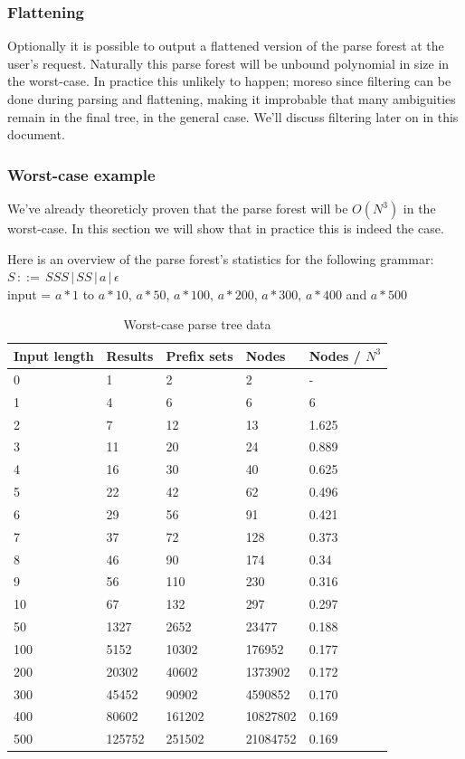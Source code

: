 \documentclass[a4paper,10pt]{article}
\begin{document}
\subsubsection{Flattening}
Optionally it is possible to output a flattened version of the parse forest at the user's request. Naturally this parse forest will be unbound polynomial in size in the worst-case. In practice this unlikely to happen; moreso since filtering can be done during parsing and flattening, making it improbable that many ambiguities remain in the final tree, in the general case. We'll discuss filtering later on in this document.

\subsubsection{Worst-case example}
We've already theoreticly proven that the parse forest will be $O(N^3)$ in the worst-case. In this section we will show that in practice this is indeed the case.

Here is an overview of the parse forest's statistics for the following grammar:\\
$S\,::=\,SSS\,|\,SS\,|\,a\,|\,\epsilon$\\
input = $a * 1$ to $a * 10$, $a * 50$, $a * 100$, $a * 200$, $a * 300$, $a * 400$ and $a * 500$

\begin{table}[H]
\centering
\begin{tabular}{ | p{6em} | p{4em} | p{5em} | p{4em} | p{5em} | }
  \hline
  Input length & Results & Prefix sets & Nodes & Nodes / $N^3$ \\
  \hline
  0 & 1 & 2 & 2 & - \\
  1 & 4 & 6 & 6 & 6 \\
  2 & 7 & 12 & 13 & 1.625 \\
  3 & 11 & 20 & 24 & 0.889 \\
  4 & 16 & 30 & 40 & 0.625 \\
  5 & 22 & 42 & 62 & 0.496 \\
  6 & 29 & 56 & 91 & 0.421 \\
  7 & 37 & 72 & 128 & 0.373 \\
  8 & 46 & 90 & 174 & 0.34 \\
  9 & 56 & 110 & 230 & 0.316 \\
  10 & 67 & 132 & 297 & 0.297 \\
  \hline
  50 & 1327 & 2652 & 23477 & 0.188 \\
  100 & 5152 & 10302 & 176952 & 0.177 \\
  200 & 20302 & 40602 & 1373902 & 0.172 \\
  300 & 45452 & 90902 & 4590852 & 0.170 \\
  400 & 80602 & 161202 & 10827802 & 0.169 \\
  500 & 125752 & 251502 & 21084752 & 0.169 \\
  \hline
\end{tabular}
\caption{Worst-case parse tree data}
\end{table}
\end{document}
